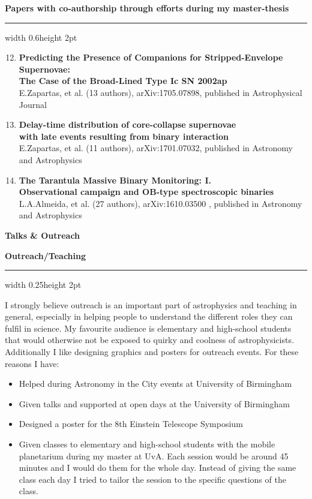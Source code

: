 \documentclass[]{res} %
\begin{document}
{\large \textbf{Papers with co-authorship through efforts during my master-thesis}} 
{\color{lightgray}\hrule width 0.6\textwidth height 2pt}
\begin{enumerate}
\setcounter{enumi}{11}
\item \textbf{Predicting the Presence of Companions for Stripped-Envelope Supernovae: \\ The Case of the Broad-Lined Type Ic SN 2002ap}\\
E.Zapartas, et al. (13 authors), arXiv:1705.07898, published in Astrophysical Journal
\item \textbf{Delay-time distribution of core-collapse supernovae \\ with late events resulting from binary interaction}\\
E.Zapartas, et al. (11 authors), arXiv:1701.07032, published in Astronomy and Astrophysics
\item \textbf{The Tarantula Massive Binary Monitoring: I. \\ Observational campaign and OB-type spectroscopic binaries}\\
L.A.Almeida, et al. (27 authors), arXiv:1610.03500 , published in Astronomy and Astrophysics
\end{enumerate}




\newpage
{\Large{\textbf{Talks \& Outreach}}}

{\large{\textbf{Outreach/Teaching}}}\
{\color{lightgray}\hrule width 0.25\textwidth height 2pt}
\vspace*{7pt}
I strongly believe outreach is an important part of astrophysics and teaching in general, especially in  helping people to understand the different roles they can fulfil in science.
My favourite audience is elementary and high-school students that would otherwise not be exposed to quirky and coolness of astrophysicists. Additionally I like designing graphics and posters for outreach events. For these reasons I have:\\

 \vspace{-10pt}
\begin{itemize}
\item{Helped during Astronomy in the City events at University of Birmingham}
\item{Given talks and supported at open days at the University of Birmingham}
\item{Designed a poster for the 8th Einstein Telescope Symposium}
\item{Given classes to elementary and high-school students with the mobile planetarium
  during my master at UvA. Each session would be around 45 minutes and I would do them
  for the whole day. Instead of giving the same class each day I tried to tailor the session
  to the specific questions of the class.}
\end{itemize}
\end{document}
